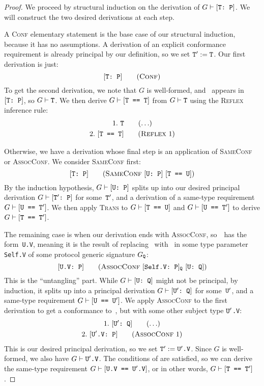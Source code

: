 \documentclass[../generics]{subfiles}
\begin{document}
\begin{proof}
We proceed by structural induction on the derivation of $G\vdash[\texttt{T:~P}]$. We will construct the two desired derivations at each step.

\BaseCase A \textsc{Conf} elementary statement is the base case of our structural induction, because it has no assumptions. A derivation of an explicit conformance requirement is already principal by our definition, so we set $\texttt{T}^\prime := \texttt{T}$. Our first derivation is just:
\[
\ConfStepDef
\]
To get the second derivation, we note that $G$ is well-formed, and \tT\ appears in $[\texttt{T:~P}]$, so $G\vdash\texttt{T}$. We then derive $G\vdash[\texttt{T == T}]$ from $G\vdash\texttt{T}$ using the \textsc{Reflex} inference rule:
\begin{gather*}
\AnyStep{\tT}{1}\\
\ReflexStep{1}{T}{2}
\end{gather*}

\InductiveStep Otherwise, we have a derivation whose final step is an application of \textsc{SameConf} or \textsc{AssocConf}. We consider \textsc{SameConf} first:
\[
\SameConfStepDef
\]
By the induction hypothesis, $G\vdash[\texttt{U:~P}]$ splits up into our desired principal derivation $G\vdash[\texttt{$\texttt{T}^\prime$:~P}]$ for some~$\texttt{T}^\prime$, and a derivation of a same-type requirement $G\vdash[\texttt{U == $\texttt{T}^\prime$}]$. We then apply \textsc{Trans} to $G\vdash[\texttt{T == U}]$ and $G\vdash[\texttt{U == $\texttt{T}^\prime$}]$ to derive $G\vdash[\texttt{T == $\texttt{T}^\prime$}]$.

The remaining case is when our derivation ends with \textsc{AssocConf}, so~\tT\ has the form~\texttt{U.V}, meaning it is the result of replacing \tSelf\ with \tU\ in some type parameter \texttt{Self.V} of some protocol generic signature $G_{\texttt{Q}}$:
\[
\AssocConfStepDefX
\]
This is the ``untangling'' part. While $G\vdash[\texttt{U:~Q}]$ might not be principal, by induction,
it splits up into a principal derivation $G\vdash[\texttt{$\texttt{U}^\prime$:~Q}]$ for some~$\texttt{U}^\prime$, and a same-type requirement $G\vdash[\texttt{U == $\texttt{U}^\prime$}]$. We apply \textsc{AssocConf} to the first derivation to get a conformance to~\tQ, but with some other subject type \texttt{$\texttt{U}^\prime$.V}:
\begin{gather*}
\AnyStep{\ConfReq{$\tUp$}{Q}}{1}\\
\AssocConfStep{1}{$\tUp$.V}{P}{2}
\end{gather*}
This is our desired principal derivation, so we set $\texttt{T}^\prime := \texttt{U}^\prime\texttt{.V}$. Since $G$ is well-formed, we also have $G\vdash\texttt{U}^\prime\texttt{.V}$. The conditions of  are satisfied, so we can derive the same-type requirement $G\vdash[\texttt{U.V == $\texttt{U}^\prime$.V}]$, or in other words, $G\vdash[\texttt{T == $\texttt{T}^\prime$}]$.
\end{proof}
\end{document}
